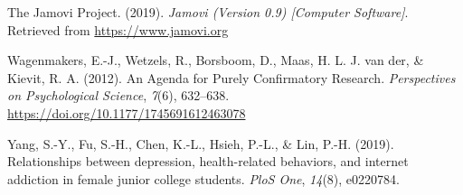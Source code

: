 \documentclass[
  man,floatsintext]{apa6}
\newlength{\cslhangindent}
\newenvironment{CSLReferences}[2] %
 {\begin{list}{}{%
  \setlength{\itemindent}{0pt}
  \setlength{\leftmargin}{0pt}
  \setlength{\parsep}{0pt}
  \ifodd #1
   \setlength{\leftmargin}{\cslhangindent}
   \setlength{\itemindent}{-1\cslhangindent}
  \fi
  \setlength{\itemsep}{#2\baselineskip}}}
 {\end{list}}
\begin{document}
\begin{CSLReferences}{1}{0}
The Jamovi Project. (2019). \emph{{Jamovi (Version 0.9) {[}Computer Software{]}}}. Retrieved from \url{https://www.jamovi.org}

Wagenmakers, E.-J., Wetzels, R., Borsboom, D., Maas, H. L. J. van der, \& Kievit, R. A. (2012). {An Agenda for Purely Confirmatory Research}. \emph{Perspectives on Psychological Science}, \emph{7}(6), 632--638. \url{https://doi.org/10.1177/1745691612463078}

Yang, S.-Y., Fu, S.-H., Chen, K.-L., Hsieh, P.-L., \& Lin, P.-H. (2019). Relationships between depression, health-related behaviors, and internet addiction in female junior college students. \emph{PloS One}, \emph{14}(8), e0220784.

\end{CSLReferences}
\end{document}
